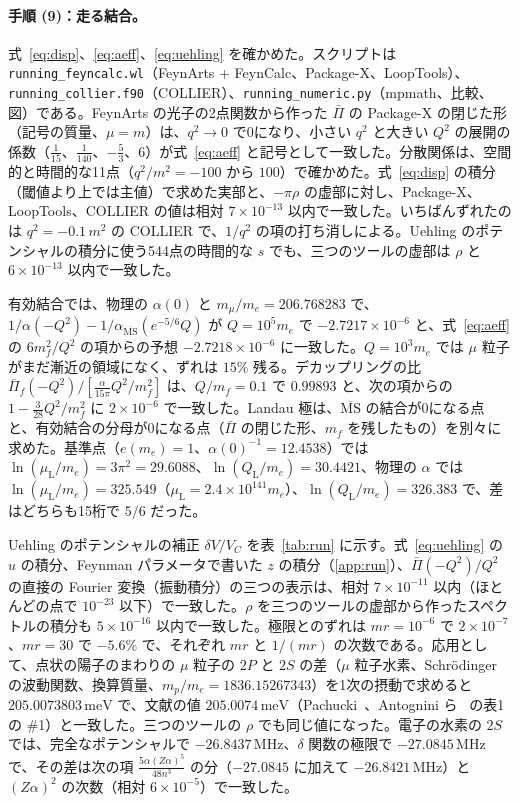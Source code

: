 \documentclass[a4paper,10pt]{ltjsarticle}
\newcommand{\MSbar}{\overline{\mathrm{MS}}}
\begin{document}
\paragraph{手順 (9)：走る結合。}式~\eqref{eq:disp}、\eqref{eq:aeff}、\eqref{eq:uehling} を確かめた。スクリプトは \texttt{running\_feyncalc.wl}（FeynArts + FeynCalc、Package-X、LoopTools）、\texttt{running\_collier.f90}（COLLIER）、\texttt{running\_numeric.py}（mpmath、比較、図）である。FeynArts の光子の2点関数から作った $\bar\Pi$ の Package-X の閉じた形（記号の質量、$\mu=m$）は、$q^2\to0$ で0になり、小さい $q^2$ と大きい $Q^2$ の展開の係数（$\frac{1}{15}$、$\frac1{140}$、$-\frac53$、$6$）が式~\eqref{eq:aeff} と記号として一致した。分散関係は、空間的と時間的な11点（$q^2/m^2=-100$ から $100$）で確かめた。式~\eqref{eq:disp} の積分（閾値より上では主値）で求めた実部と、$-\pi\rho$ の虚部に対し、Package-X、LoopTools、COLLIER の値は相対 $7\times10^{-13}$ 以内で一致した。いちばんずれたのは $q^2=-0.1\,m^2$ の COLLIER で、$1/q^2$ の項の打ち消しによる。Uehling のポテンシャルの積分に使う544点の時間的な $s$ でも、三つのツールの虚部は $\rho$ と $6\times10^{-13}$ 以内で一致した。

有効結合では、物理の $\alpha(0)$ と $m_\mu/m_e=206.768283$ で、$1/\alpha(-Q^2)-1/\alpha_{\MSbar}(e^{-5/6}Q)$ が $Q=10^5m_e$ で $-2.7217\times10^{-6}$ と、式~\eqref{eq:aeff} の $6m_f^2/Q^2$ の項からの予想 $-2.7218\times10^{-6}$ に一致した。$Q=10^3m_e$ では $\mu$ 粒子がまだ漸近の領域になく、ずれは $15\%$ 残る。デカップリングの比 $\bar\Pi_f(-Q^2)/[\frac{\alpha}{15\pi}Q^2/m_f^2]$ は、$Q/m_f=0.1$ で $0.99893$ と、次の項からの $1-\frac{3}{28}Q^2/m_f^2$ に $2\times10^{-6}$ で一致した。Landau 極は、$\MSbar$ の結合が0になる点と、有効結合の分母が0になる点（$\bar\Pi$ の閉じた形、$m_f$ を残したもの）を別々に求めた。基準点（$e(m_e)=1$、$\alpha(0)^{-1}=12.4538$）では $\ln(\mu_{\mathrm L}/m_e)=3\pi^2=29.6088$、$\ln(Q_{\mathrm L}/m_e)=30.4421$、物理の $\alpha$ では $\ln(\mu_{\mathrm L}/m_e)=325.549$（$\mu_{\mathrm L}=2.4\times10^{141}m_e$）、$\ln(Q_{\mathrm L}/m_e)=326.383$ で、差はどちらも15桁で $5/6$ だった。

Uehling のポテンシャルの補正 $\delta V/V_C$ を表~\ref{tab:run} に示す。式~\eqref{eq:uehling} の $u$ の積分、Feynman パラメータで書いた $z$ の積分（\ref{app:run}）、$\bar\Pi(-Q^2)/Q^2$ の直接の Fourier 変換（振動積分）の三つの表示は、相対 $7\times10^{-11}$ 以内（ほとんどの点で $10^{-23}$ 以下）で一致した。$\rho$ を三つのツールの虚部から作ったスペクトルの積分も $5\times10^{-16}$ 以内で一致した。極限とのずれは $mr=10^{-6}$ で $2\times10^{-7}$、$mr=30$ で $-5.6\%$ で、それぞれ $mr$ と $1/(mr)$ の次数である。応用として、点状の陽子のまわりの $\mu$ 粒子の $2P$ と $2S$ の差（$\mu$ 粒子水素、Schr\"odinger の波動関数、換算質量、$m_p/m_e=1836.15267343$）を1次の摂動で求めると $205.0073803\,\mathrm{meV}$ で、文献の値 $205.0074\,\mathrm{meV}$（Pachucki~\cite{pachucki96}、Antognini ら~\cite{antognini13} の表1の \#1）と一致した。三つのツールの $\rho$ でも同じ値になった。電子の水素の $2S$ では、完全なポテンシャルで $-26.8437\,\mathrm{MHz}$、$\delta$ 関数の極限で $-27.0845\,\mathrm{MHz}$ で、その差は次の項 $\frac{5\alpha(Z\alpha)^5}{48n^3}$ の分（$-27.0845$ に加えて $-26.8421\,\mathrm{MHz}$）と $(Z\alpha)^2$ の次数（相対 $6\times10^{-5}$）で一致した。
\end{document}
